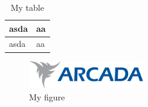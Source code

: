 \documentclass[twoside,emptyfirstpagenumber,swedish]{../thesis}
\begin{document}
\begin{table}[h]
  \begin{tabular}{ | l | p{2cm} | }
    \hline
    asda & aa \\ \hline
    asda & aa \\ \hline
  \end{tabular}
  \caption{My table}
  \label{tab:myfirsttable}
\end{table}

\begin{figure}[h]
  \caption{My figure}
  \includegraphics[width=5cm]{logo.pdf}
\end{figure}


\end{document}
